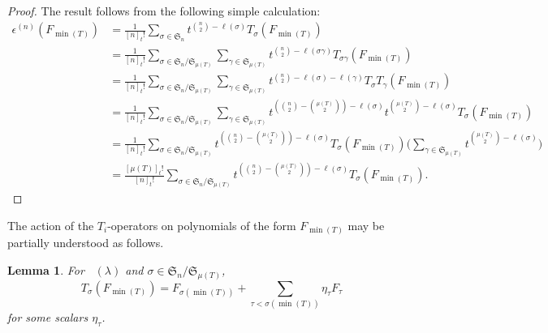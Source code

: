 \documentclass[10pt,a4paper]{amsart}
\numberwithin{equation}{section}
\newtheorem{Lemma}[Theorem]{Lemma}
\theoremstyle{definition}
\DeclareMathOperator{\RSSYT}{\mathrm{RSSYT}_{\geq 0}}
\DeclareMathOperator{\Min}{\mathrm{min}}
\begin{document}
\begin{proof}
 The result follows from the following simple calculation:
 \begin{align*}
 \epsilon^{(n)}(F_{\Min(T)}) &
 = \frac{1}{[n]_{t}!}\sum_{\sigma \in \mathfrak{S}_n} t^{{n\choose 2} - \ell(\sigma)} T_{\sigma} (F_{\Min(T)}) \\
 & = \frac{1}{[n]_{t}!}\sum_{\sigma \in \mathfrak{S}_n/\mathfrak{S}_{\mu(T)}} \sum_{\gamma \in \mathfrak{S}_{\mu(T)}} t^{{n\choose 2} - \ell(\sigma\gamma)} T_{\sigma \gamma} (F_{\Min(T)}) \\
 & = \frac{1}{[n]_{t}!}\sum_{\sigma \in \mathfrak{S}_n/\mathfrak{S}_{\mu(T)}} \sum_{\gamma \in \mathfrak{S}_{\mu(T)}} t^{{n\choose 2} - \ell(\sigma) - \ell(\gamma)} T_{\sigma} T_{\gamma} (F_{\Min(T)}) \\
 & = \frac{1}{[n]_{t}!}\sum_{\sigma \in \mathfrak{S}_n/\mathfrak{S}_{\mu(T)}} \sum_{\gamma \in \mathfrak{S}_{\mu(T)}} t^{({n\choose 2}- {\mu(T) \choose 2})- \ell(\sigma)} t^{ {\mu(T) \choose 2} - \ell(\sigma) } T_{\sigma} (F_{\Min(T)}) \\
 & = \frac{1}{[n]_{t}!}\sum_{\sigma \in \mathfrak{S}_n/\mathfrak{S}_{\mu(T)}} t^{({n\choose 2}- {\mu(T) \choose 2})- \ell(\sigma)} T_{\sigma} (F_{\Min(T)}) \biggl( \sum_{\gamma \in \mathfrak{S}_{\mu(T)}}t^{ {\mu(T) \choose 2} - \ell(\sigma) }\biggr) \\
 & = \frac{[\mu(T)]_{t}!}{[n]_{t}!} \sum_{\sigma \in \mathfrak{S}_n/\mathfrak{S}_{\mu(T)}} t^{ ({n \choose 2} - {\mu(T) \choose 2}) - \ell(\sigma)}T_{\sigma}(F_{\Min(T)}).\tag*{\qed}
 \end{align*} \renewcommand{\qed}{}
\end{proof}

The action of the $T_i$-operators on polynomials of the form $F_{\Min(T)}$ may be partially understood as follows.

\begin{Lemma}\label{triangularity for min coset reps}
For $\RSSYT(\lambda)$ and $\sigma \in \mathfrak{S}_n/\mathfrak{S}_{\mu(T)}$,
\[
T_{\sigma}(F_{\Min(T)}) = F_{\sigma(\Min(T))} + \sum_{\tau < \sigma(\Min(T))} \eta_{\tau} F_{\tau}
\]
 for some scalars $\eta_{\tau}$.
\end{Lemma}
\end{document}
